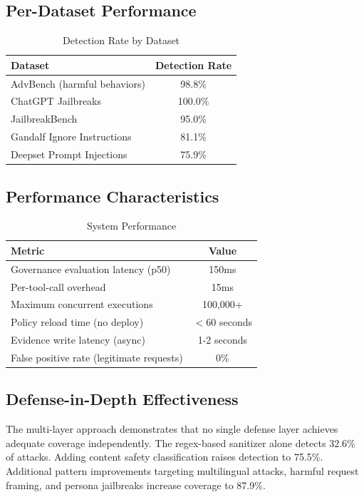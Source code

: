 \documentclass[conference]{IEEEtran}
\begin{document}
\subsection{Per-Dataset Performance}

\begin{table}[htbp]
\caption{Detection Rate by Dataset}
\centering
\begin{tabular}{|l|c|}
\hline
\textbf{Dataset} & \textbf{Detection Rate} \\
\hline
AdvBench (harmful behaviors) & 98.8\% \\
\hline
ChatGPT Jailbreaks & 100.0\% \\
\hline
JailbreakBench & 95.0\% \\
\hline
Gandalf Ignore Instructions & 81.1\% \\
\hline
Deepset Prompt Injections & 75.9\% \\
\hline
\end{tabular}
\end{table}

\subsection{Performance Characteristics}

\begin{table}[htbp]
\caption{System Performance}
\centering
\begin{tabular}{|l|c|}
\hline
\textbf{Metric} & \textbf{Value} \\
\hline
Governance evaluation latency (p50) & 150ms \\
\hline
Per-tool-call overhead & 15ms \\
\hline
Maximum concurrent executions & 100,000+ \\
\hline
Policy reload time (no deploy) & $<$60 seconds \\
\hline
Evidence write latency (async) & 1-2 seconds \\
\hline
False positive rate (legitimate requests) & 0\% \\
\hline
\end{tabular}
\end{table}

\subsection{Defense-in-Depth Effectiveness}

The multi-layer approach demonstrates that no single defense layer achieves adequate coverage independently. The regex-based sanitizer alone detects 32.6\% of attacks. Adding content safety classification raises detection to 75.5\%. Additional pattern improvements targeting multilingual attacks, harmful request framing, and persona jailbreaks increase coverage to 87.9\%.
\end{document}
